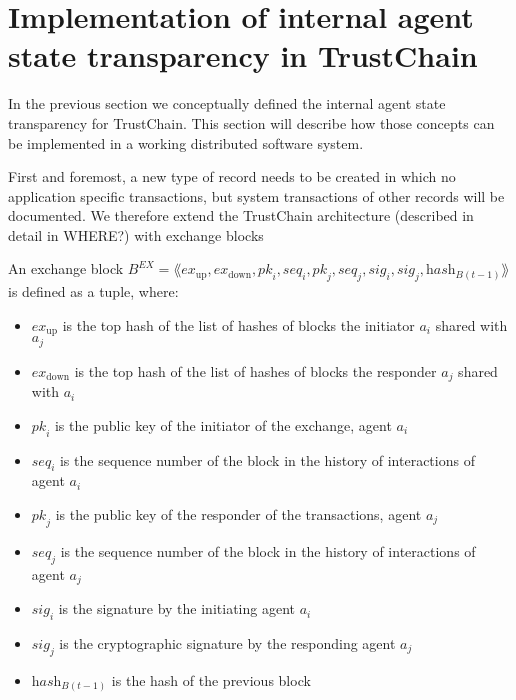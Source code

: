 \section{Implementation of internal agent state transparency in TrustChain}
In the previous section we conceptually defined the internal agent state transparency for TrustChain.
This section will describe how those concepts can be implemented in a working distributed software
system. 

First and foremost, a new type of record needs to be created in which no application specific 
transactions, but system transactions of other records will be documented. We therefore extend the
TrustChain architecture (described in detail in {\color{red} WHERE?}) with exchange blocks 

\begin{defn}
    An exchange block $B^{EX} = \lAngle \textit{ex}_{\text{up}}, \textit{ex}_{\text{down}}, \textit{pk}_i, \textit{seq}_i, \textit{pk}_j, \textit{seq}_j, \textit{sig}_i, \textit{sig}_j, \textit{hash}_{B(t-1)} \rAngle$ is defined as a tuple, where:
    
    \begin{itemize}
        \item $\textit{ex}_{\text{up}}$ is the top hash of the list of hashes of blocks the initiator $a_i$ shared with $a_j$
        \item $\textit{ex}_{\text{down}}$ is the top hash of the list of hashes of blocks the responder $a_j$ shared with $a_i$
        \item $\textit{pk}_i$ is the public key of the initiator of the exchange, agent $a_i$
        \item $\textit{seq}_i$ is the sequence number of the block in the history of interactions of agent $a_i$
        \item $\textit{pk}_j$ is the public key of the responder of the transactions, agent $a_j$
        \item $\textit{seq}_j$ is the sequence number of the block in the history of interactions of agent $a_j$
        \item $\textit{sig}_i$ is the signature by the initiating agent $a_i$
        \item $\textit{sig}_j$ is the cryptographic signature by the responding agent $a_j$
        \item $\textit{hash}_{B(t-1)}$ is the hash of the previous block
    \end{itemize}
\end{defn}

